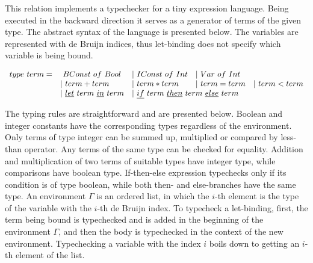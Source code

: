 This relation implements a typechecker for a tiny expression language.
Being executed in the backward direction it serves as a generator of terms of the given type.
The abstract syntax of the language is presented below.
The variables are represented with de Bruijn indices, thus let-binding does not specify which variable is being bound.

\[\begin{array}{lllll}
  type \ term = &\ BConst \ of \ Bool &| \ IConst \ of \ Int &| \ Var \ of \ Int & \\
  & | \ term + term &| \ term * term &| \ term = term &| \ term < term \\
  &| \ \underline{let} \ term \ \underline{in} \ term
  &\multicolumn{2}{l}{| \ \underline{if} \ term \ \underline{then} \ term \ \underline{else} \ term} &
\end{array}\]

The typing rules are straightforward and are presented below.
Boolean and integer constants have the corresponding types regardless of the environment.
Only terms of type integer can be summed up, multiplied or compared by less-than operator.
Any terms of the same type can be checked for equality.
Addition and multiplication of two terms of suitable types have integer type, while comparisons have boolean type.
If-then-else expression typechecks only if its condition is of type boolean, while both then- and else-branches have the same type.
An environment $\Gamma$ is an ordered list, in which the $i$-th element is the type of the variable with the $i$-th de Bruijn index.
To typecheck a let-binding, first, the term being bound is typechecked and is added in the beginning of the environment $\Gamma$, and then the body is typechecked in the context of the new environment.
Typechecking a variable with the index $i$ boils down to getting an $i$-th element of the list.

